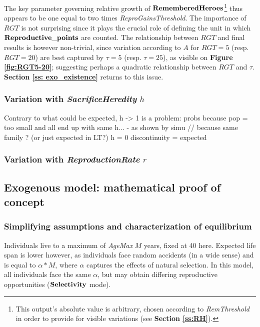 \documentclass[a4paper,12pt]{article}
\begin{document}
The key parameter governing relative growth of $\bf{RememberedHeroes}$\footnote{
This output's absolute value is arbitrary, chosen according to \emph{RemThreshold} in
order to provide for visible variations (see \textbf{Section \ref{ss:RH}}).
} thus appears to be one equal to two times
\emph{ReproGainsThreshold}. The importance of $RGT$ is not surprising since it plays
the crucial role of defining the unit in which $\bf{Reproductive\_points}$ are counted.  
The relationship between $RGT$ and final results is however non-trivial, since 
variation according to $A$ for $RGT=5$ (resp. $RGT=20$) are best captured by $\tau=5$
(resp. $\tau=25$), as visible on \textbf{Figure \ref{fig:RGT5-20}}; suggesting perhaps
a quadratic relationship between $RGT$ and $\tau$. \textbf{Section \ref{ss: exo_existence}}
returns to this issue.

\subsubsection{Variation with \emph{SacrificeHeredity} $h$}

Contrary to what could be expected, h -> 1 is a problem: probs because pop = too small
and all end up with same h... - as shown by simu // because same family ? (or just expected in LT?)
h = 0 discontinuity = expected

\subsubsection{Variation with \emph{ReproductionRate} $r$}

\subsection{Exogenous model: mathematical proof of concept}
\label{sec_exo_math}

\subsubsection{Simplifying assumptions and characterization of equilibrium}
\label{ss:exm_eq}
Individuals live to a maximum of \emph{AgeMax} $M$ years, fixed at 40 here. 
 Expected life span is lower however, as individuals face random accidents
 (in a wide sense) and is equal to $\alpha*M$, where $\alpha$ captures
 the effects of natural selection. In this model, all individuals face the same $\alpha$, but
 may obtain differing reproductive opportunities ($\bf{Selectivity}$ mode).
\end{document}
